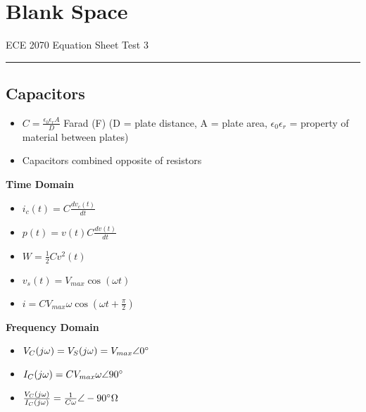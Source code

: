 \documentclass [12pt] {article}
\begin{document}
\section{Blank Space}
\newpage
ECE 2070 Equation Sheet \hfill Test 3 \\
\rule{7.6in}{0.4pt}
\begin{multicols*}{2}
\section{Capacitors}
	\begin{itemize}
		\item $C = \frac{\epsilon_0\epsilon_rA}{D}$ Farad (F) (D = plate distance, A = plate area, $\epsilon_0\epsilon_r$ = property of material between plates)
		\item Capacitors combined opposite of resistors
	\end{itemize}
\textbf{Time Domain} 
	\begin{itemize}
		\item $i_c(t) = C\frac{dv_c(t)}{dt}$  
		\item $p(t) = v(t)C\frac{dv(t)}{dt} $
		\item $W = \frac{1}{2}Cv^2(t)$
		\item $v_s(t) = V_{max}\cos(\omega t) $
		\item $i = CV_{max}\omega\cos(\omega t + \frac{\pi}{2}) $
	\end{itemize}
\textbf{Frequency Domain} 
	\begin{itemize}
		\item $V_C(j\omega)  = V_S(j\omega) = V_{max}\angle 0\degree$ 
		\item $I_C(j\omega) = CV_{max}\omega\angle 90\degree$
		\item $\frac{V_C(j\omega)}{I_C(j\omega)} = \frac{1}{C\omega}\angle -90\degree \Omega $
	\end{itemize}

\end{multicols*}
\end{document}
